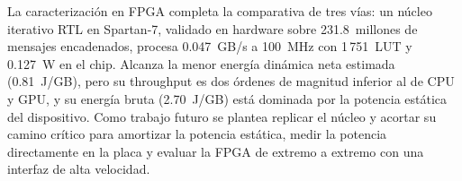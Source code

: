 

La caracterización en FPGA completa la comparativa de tres vías: un núcleo
iterativo RTL en Spartan-7, validado en hardware sobre 231.8~millones de
mensajes encadenados, procesa 0.047~GB/s a 100~MHz con 1\,751~LUT y
0.127~W en el chip. Alcanza la menor energía dinámica neta estimada
(0.81~J/GB), pero su throughput es dos órdenes de magnitud inferior al de
CPU y GPU, y su energía bruta (2.70~J/GB) está dominada por la potencia
estática del dispositivo. Como trabajo futuro se plantea replicar el núcleo
y acortar su camino crítico para amortizar la potencia estática, medir la
potencia directamente en la placa y evaluar la FPGA de extremo a extremo con
una interfaz de alta velocidad.
